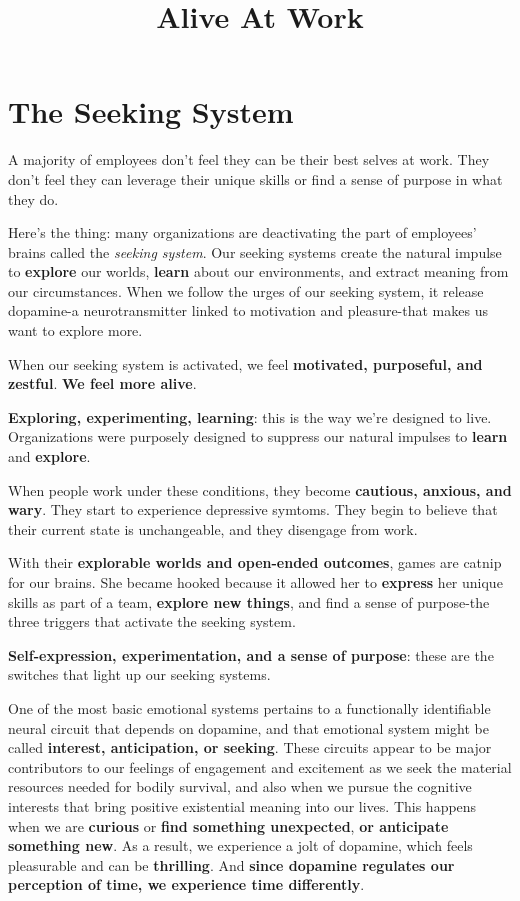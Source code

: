 \documentclass[ebook,12pt,oneside,openany]{memoir}
\begin{document}
\title{Alive At Work}
\maketitle
\section{The Seeking System}
A majority of employees don't feel they can be their best selves at work.
They don't feel they can leverage their unique skills or find a sense of purpose in what they do.

Here's the thing: many organizations are deactivating the part of employees' brains called the \textit{seeking system}.
Our seeking systems create the natural impulse to \textbf{explore} our worlds, \textbf{learn} about our environments, and extract meaning from our circumstances.
When we follow the urges of our seeking system, it release dopamine-a neurotransmitter linked to motivation and pleasure-that makes us want to explore more.

When our seeking system is activated, we feel \textbf{motivated, purposeful, and zestful}. \textbf{We feel more alive}.

\textbf{Exploring, experimenting, learning}: this is the way we're designed to live. Organizations were purposely designed to suppress our natural impulses to \textbf{learn} and \textbf{explore}.

When people work under these conditions, they become \textbf{cautious, anxious, and wary}. They start to experience depressive symtoms.
They begin to believe that their current state is unchangeable, and they disengage from work. 

With their \textbf{explorable worlds and open-ended outcomes}, games are catnip for our brains.
She became hooked because it allowed her to \textbf{express} her unique skills as part of a team, \textbf{explore new things}, and find a sense of purpose-the three triggers that activate the seeking system.

\textbf{Self-expression, experimentation, and a sense of purpose}: these are the switches that light up our seeking systems.

One of the most basic emotional systems pertains to a functionally identifiable neural circuit that depends on dopamine, and that emotional system might be called \textbf{interest, anticipation, or seeking}.
These circuits appear to be major contributors to our feelings of engagement and excitement as we seek the material resources needed for bodily survival, and also when we pursue the cognitive interests that bring positive existential meaning into our lives.
This happens when we are \textbf{curious} or \textbf{find something unexpected}, \textbf{or anticipate something new}.
As a result, we experience a jolt of dopamine, which feels pleasurable and can be \textbf{thrilling}.
And \textbf{since dopamine regulates our perception of time, we experience time differently}.
\end{document}
